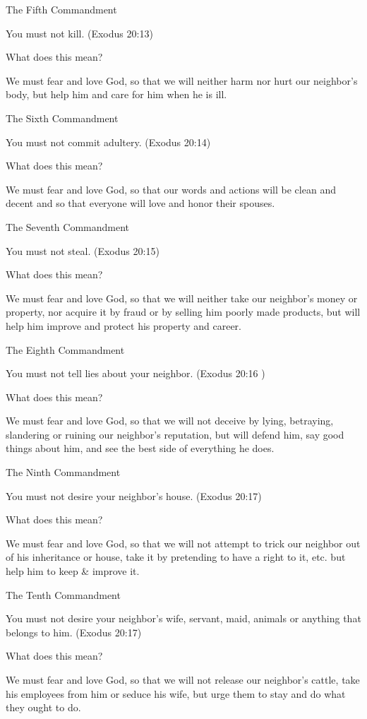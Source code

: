 The Fifth Commandment

You must not kill. (Exodus 20:13)

What does this mean?

We must fear and love God, so that we will neither harm nor hurt our
neighbor's body, but help him and care for him when he is ill.

The Sixth Commandment

You must not commit adultery. (Exodus 20:14)

What does this mean?

We must fear and love God, so that our words and actions will be clean
and decent and so that everyone will love and honor their spouses.

The Seventh Commandment

You must not steal. (Exodus 20:15)

What does this mean?

We must fear and love God, so that we will neither take our neighbor's
money or property, nor acquire it by fraud or by selling him poorly
made products, but will help him improve and protect his property and
career.

The Eighth Commandment

You must not tell lies about your neighbor. (Exodus 20:16 )

What does this mean?

We must fear and love God, so that we will not deceive by lying,
betraying, slandering or ruining our neighbor's reputation, but will
defend him, say good things about him, and see the best side of
everything he does.

The Ninth Commandment

You must not desire your neighbor's house. (Exodus 20:17)

What does this mean?

We must fear and love God, so that we will not attempt to trick our
neighbor out of his inheritance or house, take it by pretending to have
a right to it, etc. but help him to keep & improve it.

The Tenth Commandment

You must not desire your neighbor's wife, servant, maid, animals or
anything that belongs to him. (Exodus 20:17)

What does this mean?

We must fear and love God, so that we will not release our neighbor's
cattle, take his employees from him or seduce his wife, but urge them
to stay and do what they ought to do.

